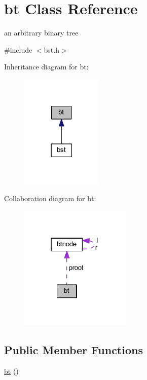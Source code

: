 \hypertarget{classbt}{\section{bt Class Reference}
\label{classbt}
}


an arbitrary binary tree  




{\ttfamily \#include $<$bst.\-h$>$}



Inheritance diagram for bt\-:
\nopagebreak
\begin{figure}[H]
\begin{center}
\leavevmode
\includegraphics[width=110pt]{classbt__inherit__graph}
\end{center}
\end{figure}


Collaboration diagram for bt\-:
\nopagebreak
\begin{figure}[H]
\begin{center}
\leavevmode
\includegraphics[width=150pt]{classbt__coll__graph}
\end{center}
\end{figure}
\subsection*{Public Member Functions}
\begin{DoxyCompactItemize}
\item 
\hyperlink{classbt_a39717d66f405aeb141610d4c8854c583}{bt} ()
\end{DoxyCompactItemize}

